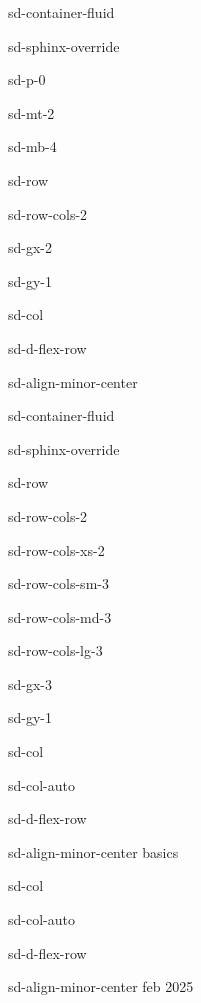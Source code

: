 \documentclass[letterpaper,10pt,italian]{jupyterBook}
\begin{document}
\begin{sphinxuseclass}{sd-container-fluid}
\begin{sphinxuseclass}{sd-sphinx-override}
\begin{sphinxuseclass}{sd-p-0}
\begin{sphinxuseclass}{sd-mt-2}
\begin{sphinxuseclass}{sd-mb-4}
\begin{sphinxuseclass}{sd-row}
\begin{sphinxuseclass}{sd-row-cols-2}
\begin{sphinxuseclass}{sd-gx-2}
\begin{sphinxuseclass}{sd-gy-1}
\begin{sphinxuseclass}{sd-col}
\begin{sphinxuseclass}{sd-d-flex-row}
\begin{sphinxuseclass}{sd-align-minor-center}
\begin{sphinxuseclass}{sd-container-fluid}
\begin{sphinxuseclass}{sd-sphinx-override}
\begin{sphinxuseclass}{sd-row}
\begin{sphinxuseclass}{sd-row-cols-2}
\begin{sphinxuseclass}{sd-row-cols-xs-2}
\begin{sphinxuseclass}{sd-row-cols-sm-3}
\begin{sphinxuseclass}{sd-row-cols-md-3}
\begin{sphinxuseclass}{sd-row-cols-lg-3}
\begin{sphinxuseclass}{sd-gx-3}
\begin{sphinxuseclass}{sd-gy-1}
\begin{sphinxuseclass}{sd-col}
\begin{sphinxuseclass}{sd-col-auto}
\begin{sphinxuseclass}{sd-d-flex-row}
\begin{sphinxuseclass}{sd-align-minor-center}
\sphinxAtStartPar
basics

\end{sphinxuseclass}
\end{sphinxuseclass}
\end{sphinxuseclass}
\end{sphinxuseclass}
\begin{sphinxuseclass}{sd-col}
\begin{sphinxuseclass}{sd-col-auto}
\begin{sphinxuseclass}{sd-d-flex-row}
\begin{sphinxuseclass}{sd-align-minor-center}
 feb 2025


\end{sphinxuseclass}
\end{sphinxuseclass}
\end{sphinxuseclass}
\end{sphinxuseclass}
\end{sphinxuseclass}
\end{sphinxuseclass}
\end{sphinxuseclass}
\end{sphinxuseclass}
\end{sphinxuseclass}
\end{sphinxuseclass}
\end{sphinxuseclass}
\end{sphinxuseclass}
\end{sphinxuseclass}
\end{sphinxuseclass}
\end{sphinxuseclass}
\end{sphinxuseclass}
\end{sphinxuseclass}
\end{sphinxuseclass}
\end{sphinxuseclass}
\end{sphinxuseclass}
\end{sphinxuseclass}
\end{sphinxuseclass}
\end{sphinxuseclass}
\end{sphinxuseclass}
\end{sphinxuseclass}
\end{sphinxuseclass}
\end{document}
